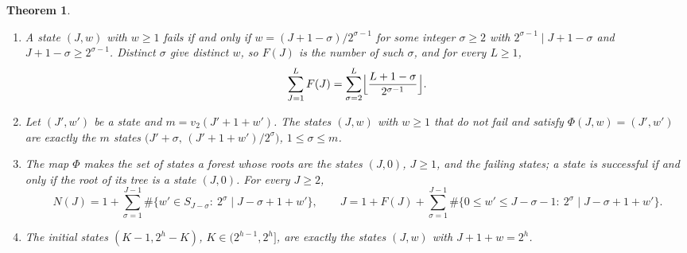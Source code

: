\documentclass[11pt]{amsart}
\newtheorem{Theorem}{Theorem}[section]
\theoremstyle{definition}
\begin{document}
\begin{Theorem}
\label{thm:forest}
\begin{enumerate}
\item A state $(J,w)$ with $w\ge1$ fails if and only if $w=(J+1-\sigma)/2^{\sigma-1}$ for some integer $\sigma\ge2$ with $2^{\sigma-1}\mid J+1-\sigma$ and $J+1-\sigma\ge2^{\sigma-1}$. Distinct $\sigma$ give distinct $w$, so $F(J)$ is the number of such $\sigma$, and for every $L\ge1$,
\[
\sum_{J=1}^{L}F(J)=\sum_{\sigma=2}^{L}\Bigl\lfloor\frac{L+1-\sigma}{2^{\sigma-1}}\Bigr\rfloor.
\]
\item Let $(J',w')$ be a state and $m=v_2(J'+1+w')$. The states $(J,w)$ with $w\ge1$ that do not fail and satisfy $\Phi(J,w)=(J',w')$ are exactly the $m$ states $\bigl(J'+\sigma,\,(J'+1+w')/2^{\sigma}\bigr)$, $1\le\sigma\le m$.
\item The map $\Phi$ makes the set of states a forest whose roots are the states $(J,0)$, $J\ge1$, and the failing states; a state is successful if and only if the root of its tree is a state $(J,0)$. For every $J\ge2$,
\[
N(J)=1+\sum_{\sigma=1}^{J-1}\#\bigl\{w'\in S_{J-\sigma}:\ 2^{\sigma}\mid J-\sigma+1+w'\bigr\},\qquad J=1+F(J)+\sum_{\sigma=1}^{J-1}\#\bigl\{0\le w'\le J-\sigma-1:\ 2^{\sigma}\mid J-\sigma+1+w'\bigr\}.
\]
\item The initial states $(K-1,2^h-K)$, $K\in(2^{h-1},2^h]$, are exactly the states $(J,w)$ with $J+1+w=2^h$.
\end{enumerate}
\end{Theorem}
\end{document}
